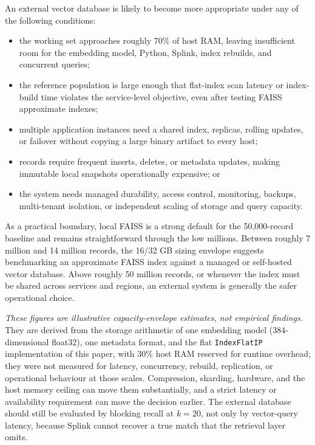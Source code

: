 \documentclass[11pt]{article}
\begin{document}
An external vector database is likely to become more appropriate under any of the following conditions:
\begin{itemize}[leftmargin=*]
  \item the working set approaches roughly 70\% of host RAM, leaving insufficient room for the embedding model, Python, Splink, index rebuilds, and concurrent queries;
  \item the reference population is large enough that flat-index scan latency or index-build time violates the service-level objective, even after testing FAISS approximate indexes;
  \item multiple application instances need a shared index, replicas, rolling updates, or failover without copying a large binary artifact to every host;
  \item records require frequent inserts, deletes, or metadata updates, making immutable local snapshots operationally expensive; or
  \item the system needs managed durability, access control, monitoring, backups, multi-tenant isolation, or independent scaling of storage and query capacity.
\end{itemize}

As a practical boundary, local FAISS is a strong default for the 50,000-record baseline and remains straightforward through the low millions. Between roughly 7 million and 14 million records, the 16/32 GB sizing envelope suggests benchmarking an approximate FAISS index against a managed or self-hosted vector database. Above roughly 50 million records, or whenever the index must be shared across services and regions, an external system is generally the safer operational choice.

\emph{These figures are illustrative capacity-envelope estimates, not empirical findings.} They are derived from the storage arithmetic of one embedding model (384-dimensional float32), one metadata format, and the flat \texttt{IndexFlatIP} implementation of this paper, with 30\% host RAM reserved for runtime overhead; they were not measured for latency, concurrency, rebuild, replication, or operational behaviour at those scales. Compression, sharding, hardware, and the host memory ceiling can move them substantially, and a strict latency or availability requirement can move the decision earlier. The external database should still be evaluated by blocking recall at $k=20$, not only by vector-query latency, because Splink cannot recover a true match that the retrieval layer omits.
\end{document}
